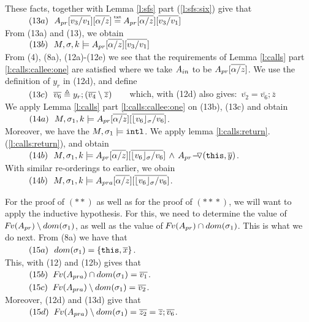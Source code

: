 \begin{description}
These facts, together with   Lemma \ref{l:sfs}  part (\ref{l:sfs:six}) give that\\
$\SPS (13a) \ \    \Apr[\overline{v_3/v_1}][\overline{\alpha/z}] \txteq   \Apr[\overline{\alpha/z}]  [\overline{v_3/v_1}] $\\
From (13a) and (13), we obtain
\\
$\strut \ \ \hspace{0.5cm} \ \  (13b) \ \     M,\sigma ,{k} \models { A_{pr}[\overline{\alpha/z}]  [\overline{v_3/v_1}] } $
\\
From (4), (8a), (12a)-(12e)  we see that the requirements  %
 of Lemma \ref{l:calls}  part  \ref{l:calls:callee:one} are satisfied where we take  $A_{in}$ to be $A_{pr}[\overline{\alpha/z}]$.
 We use the definition of $y_r$ in (12d), and define\\
$\strut \ \ \hspace{0.5cm} \ \  (13c) \ \ \overline {v_6} \triangleq  y_r;  (\overline {v_4}\setminus \overline{z})$\ \ \ \ which, with (12d) also gives:\ $ \overline {v_2} = \overline{v_6}; \overline{z}$
\\
We apply   Lemma   \ref{l:calls} part \ref{l:calls:callee:one} on (13b), (13c)  and  obtain\\
$\strut \ \ \hspace{0.5cm} \ \  (14a) \ \  M,\sigma_1 ,{k} \models { A_{pr}[\overline{\alpha/z}][ \overline {  \lfloor v_6 \rfloor_{\sigma}/v_6}] }  $. \\
Moreover, we have the $M, \sigma_1 \models \mbox{\normalfont{\texttt{intl}}}$. We apply lemma \ref{l:calls:return}.(\ref{l:calls:return}), and obtain\\
$\strut \ \ \hspace{0.5cm} \ \  (14b) \ \  M,\sigma_1 ,{k} \models { A_{pr}[\overline{\alpha/z}][ \overline {  \lfloor v_6 \rfloor_{\sigma}/v_6}] 
          \, \wedge\,  
          { \ensuremath{ A_{pr} \!-\!\!\!\,\!{\triangledown} (\mbox{\normalfont{\texttt{this}}}, \overline y)}   
       } }  $. \\
 With similar re-orderings to earlier, we obain\\
$\strut \ \ \hspace{0.5cm} \ \  (14b) \ \  M,\sigma_1 ,{k} \models {A_{pra}[\overline{\alpha/z}][\overline{\lfloor v_6 \rfloor_{\sigma}/v_6}]} $. 

\vspace{.1cm}

For the proof of $(**)$ as well as for the proof of $(*\!*\!*)$, we will want to apply the inductive hypothesis.   For this, we need to determine the value of  
${\hspace{-1pt}F\hspace{-1pt}}v(A_{pr})  \setminus dom(\sigma_1)$, as well as the value of ${\hspace{-1pt}F\hspace{-1pt}}v(A_{pr})  \cap dom(\sigma_1)$. 
  This is what we do next. From (8a) we have that\\
$\strut \ \ \hspace{0.5cm} \ \  (15a) \ \  dom(\sigma_1)=\{ \mbox{\normalfont{\texttt{this}}}, \overline x \}$.\\
This, with (12)  and (12b)  gives  that\\
$\strut \ \ \hspace{0.5cm} \ \  (15b) \ \ {\hspace{-1pt}F\hspace{-1pt}}v(A_{pra})\cap dom(\sigma_1)= \overline {v_1}$.\\
$\strut \ \ \hspace{0.5cm} \ \  (15c) \ \  {\hspace{-1pt}F\hspace{-1pt}}v(A_{pra})  \setminus dom(\sigma_1) = \overline {v_2}$. \\
Moreover, (12d) and (13d) give that\\
$\strut \ \ \hspace{0.5cm} \ \  (15d) \ \  {\hspace{-1pt}F\hspace{-1pt}}v(A_{pra})  \setminus dom(\sigma_1) = \overline{z_2} = \overline {z}; \overline{v_6}$.


\end{description}
